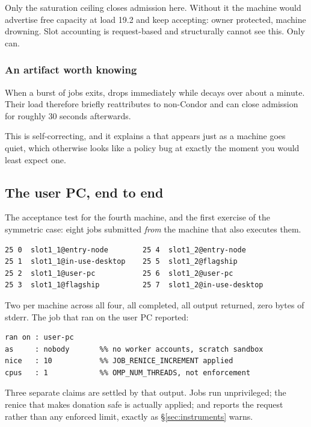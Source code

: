 \begin{keypoint}
Only the saturation ceiling closes admission here. Without it the machine would
advertise free capacity at load 19.2 and keep accepting: owner protected,
machine drowning. Slot accounting is request-based and structurally cannot see
this. Only  can.
\end{keypoint}

\subsubsection{An artifact worth knowing}

When a burst of jobs exits,  drops immediately while
 decays over about a minute. Their load therefore briefly
reattributes to non-Condor and can close admission for roughly 30 seconds
afterwards.

This is self-correcting, and it explains a  that appears just as
a machine goes quiet, which otherwise looks like a policy bug at exactly the
moment you would least expect one.

\subsection{The user PC, end to end}


The acceptance test for the fourth machine, and the first exercise of the
symmetric case: eight jobs submitted \emph{from} the machine that also executes
them.

\begin{lstlisting}[style=term]
25 0  slot1_1@entry-node        25 4  slot1_2@entry-node
25 1  slot1_1@in-use-desktop    25 5  slot1_2@flagship
25 2  slot1_1@user-pc           25 6  slot1_2@user-pc
25 3  slot1_1@flagship          25 7  slot1_2@in-use-desktop
\end{lstlisting}

Two per machine across all four, all completed, all output returned, zero bytes
of stderr. The job that ran on the user PC reported:

\begin{lstlisting}[style=term]
ran on : user-pc
as     : nobody       %% no worker accounts, scratch sandbox
nice   : 10           %% JOB_RENICE_INCREMENT applied
cpus   : 1            %% OMP_NUM_THREADS, not enforcement
\end{lstlisting}

Three separate claims are settled by that output. Jobs run unprivileged; the
renice that makes donation safe is actually applied; and  reports the
request rather than any enforced limit, exactly as \S\ref{sec:instruments}
warns.

